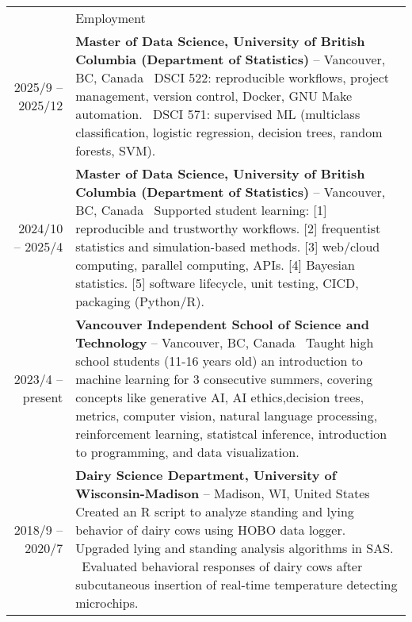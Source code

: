 \documentclass[letterpaper, 11pt]{article}
\newcommand{\headingfont}{\Large\color{OliveGreen}}
\newenvironment{SectionTable}[1]{
	\renewcommand*{\arraystretch}{1.7}
	\setlength{\tabcolsep}{10pt}
	\begin{longtable}{Rp{5.2in}} & #1 \\}
{\end{longtable}\vspace{-.3cm}}
\begin{document}
\begin{SectionTable}{\headingfont Employment}
2025/9 -- 2025/12 &
 \textbf{Master of Data Science, University of British Columbia (Department of Statistics)}  \newline
  -- Vancouver, BC, Canada \newline
  \textbullet\, DSCI 522: reproducible workflows, project management, version control, Docker, GNU Make automation. \newline
  \textbullet\, DSCI 571: supervised ML (multiclass classification, logistic regression, decision trees, random forests, SVM). \\
2024/10 -- 2025/4 &
 \textbf{Master of Data Science, University of British Columbia (Department of Statistics)}  \newline
  -- Vancouver, BC, Canada \newline
  \textbullet\, Supported student learning: [1] reproducible and trustworthy workflows. [2] frequentist statistics and simulation-based methods. [3] web/cloud computing, parallel computing, APIs. [4] Bayesian statistics. [5] software lifecycle, unit testing, CICD, packaging (Python/R). \\
2023/4 -- present &
 \textbf{Vancouver Independent School of Science and Technology}  \newline
{} -- Vancouver, BC, Canada \newline
\textbullet\, Taught high school students (11-16 years old) an introduction to machine learning for 3 consecutive summers, covering concepts like generative AI, AI ethics,decision trees, metrics, computer vision, natural language processing, reinforcement learning, statistcal inference, introduction to programming, and data visualization. \\
2018/9 -- 2020/7 &
\textbf{Dairy Science Department, University of Wisconsin-Madison} \newline
{} -- Madison, WI, United States \newline
\textbullet\, Created an R script to analyze standing and lying behavior of dairy cows using HOBO data logger. Upgraded lying and standing analysis algorithms in SAS. \newline
\textbullet\, Evaluated behavioral responses of dairy cows after subcutaneous insertion of real-time temperature detecting microchips.  \newline

\end{SectionTable}
\end{document}
